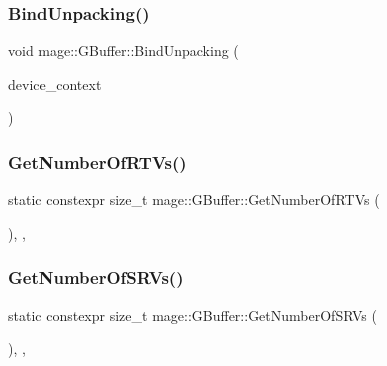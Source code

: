 \hypertarget{structmage_1_1_g_buffer_ae8495251fe7fc2402f8f8bae30c57b94}{}\label{structmage_1_1_g_buffer_ae8495251fe7fc2402f8f8bae30c57b94} 
\subsubsection{\texorpdfstring{Bind\+Unpacking()}{BindUnpacking()}}
{\footnotesize\ttfamily void mage\+::\+G\+Buffer\+::\+Bind\+Unpacking (\begin{DoxyParamCaption}\item[{I\+D3\+D11\+Device\+Context2 $\ast$}]{device\+\_\+context }\end{DoxyParamCaption})\hspace{0.3cm}{\ttfamily [noexcept]}}

\hypertarget{structmage_1_1_g_buffer_a732cac527995dda5a9b19991fd23e0cf}{}\label{structmage_1_1_g_buffer_a732cac527995dda5a9b19991fd23e0cf} 
\subsubsection{\texorpdfstring{Get\+Number\+Of\+R\+T\+Vs()}{GetNumberOfRTVs()}}
{\footnotesize\ttfamily static constexpr size\+\_\+t mage\+::\+G\+Buffer\+::\+Get\+Number\+Of\+R\+T\+Vs (\begin{DoxyParamCaption}{ }\end{DoxyParamCaption})\hspace{0.3cm}{\ttfamily [static]}, {\ttfamily [private]}, {\ttfamily [noexcept]}}

\hypertarget{structmage_1_1_g_buffer_ae7966e3c50ecf69c153e05b01da7456e}{}\label{structmage_1_1_g_buffer_ae7966e3c50ecf69c153e05b01da7456e} 
\subsubsection{\texorpdfstring{Get\+Number\+Of\+S\+R\+Vs()}{GetNumberOfSRVs()}}
{\footnotesize\ttfamily static constexpr size\+\_\+t mage\+::\+G\+Buffer\+::\+Get\+Number\+Of\+S\+R\+Vs (\begin{DoxyParamCaption}{ }\end{DoxyParamCaption})\hspace{0.3cm}{\ttfamily [static]}, {\ttfamily [private]}, {\ttfamily [noexcept]}}

